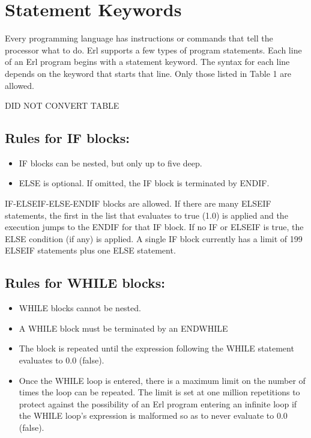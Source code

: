 \section{Statement Keywords}\label{statement-keywords}

Every programming language has instructions or commands that tell the processor what to do. Erl supports a few types of program statements. Each line of an Erl program begins with a statement keyword. The syntax for each line depends on the keyword that starts that line. Only those listed in Table 1 are allowed.

DID NOT CONVERT TABLE

\subsection{Rules for IF blocks:}\label{rules-for-if-blocks}

\begin{itemize}
\item
  IF blocks can be nested, but only up to five deep.
\item
  ELSE is optional. If omitted, the IF block is terminated by ENDIF.
\end{itemize}

IF-ELSEIF-ELSE-ENDIF blocks are allowed. If there are many ELSEIF statements, the first in the list that evaluates to true (1.0) is applied and the execution jumps to the ENDIF for that IF block. If no IF or ELSEIF is true, the ELSE condition (if any) is applied. A single IF block currently has a limit of 199 ELSEIF statements plus one ELSE statement.

\subsection{Rules for WHILE blocks:}\label{rules-for-while-blocks}

\begin{itemize}
\item
  WHILE blocks cannot be nested.
\item
  A WHILE block must be terminated by an ENDWHILE
\item
  The block is repeated until the expression following the WHILE statement evaluates to 0.0 (false).
\item
  Once the WHILE loop is entered, there is a maximum limit on the number of times the loop can be repeated. The limit is set at one million repetitions to protect against the possibility of an Erl program entering an infinite loop if the WHILE loop's expression is malformed so as to never evaluate to 0.0 (false).
\end{itemize}

